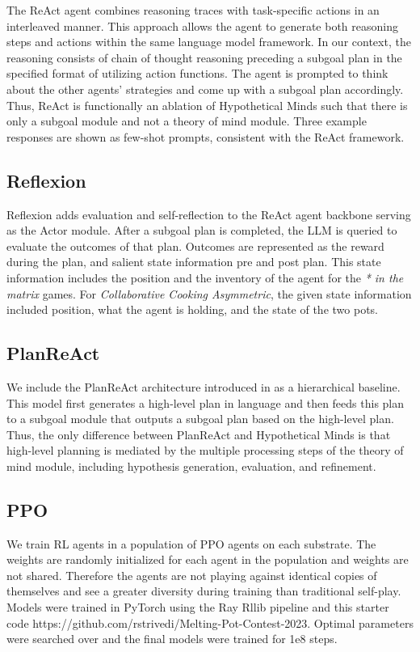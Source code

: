 \documentclass{article} %
\begin{document}
The ReAct \citep{yao2022react} agent combines reasoning traces with task-specific actions in an interleaved manner. This approach allows the agent to generate both reasoning steps and actions within the same language model framework. In our context, the reasoning consists of chain of thought reasoning preceding a subgoal plan in the specified format of utilizing action functions. The agent is prompted to think about the other agents' strategies and come up with a subgoal plan accordingly. Thus, ReAct is functionally an ablation of Hypothetical Minds such that there is only a subgoal module and not a theory of mind module. Three example responses are shown as few-shot prompts, consistent with the ReAct framework.

\subsection{Reflexion}

Reflexion adds evaluation and self-reflection to the ReAct agent backbone serving as the Actor module. After a subgoal plan is completed, the LLM is queried to evaluate the outcomes of that plan. Outcomes are represented as the reward during the plan, and salient state information pre and post plan. This state information includes the position and the inventory of the agent for the \textit{* in the matrix} games. For \textit{Collaborative Cooking Asymmetric}, the given state information included position, what the agent is holding, and the state of the two pots.

\subsection{PlanReAct}

We include the PlanReAct architecture introduced in \citep{liu2023bolaa} as a hierarchical baseline. This model first generates a high-level plan in language and then feeds this plan to a subgoal module that outputs a subgoal plan based on the high-level plan. Thus, the only
difference between PlanReAct and Hypothetical Minds is that high-level planning is mediated by the multiple processing steps of the theory of mind module, including hypothesis generation, evaluation, and refinement.

\subsection{PPO}

We train RL agents in a population of PPO agents \citep{schulman2017proximal} on each substrate. The weights are randomly initialized for each agent in the population and weights are not shared. Therefore the agents are not playing against identical copies of themselves and see a greater diversity during training than traditional self-play. Models were trained in PyTorch using the Ray Rllib pipeline and this starter code https://github.com/rstrivedi/Melting-Pot-Contest-2023. Optimal parameters were searched over and the final models were trained for 1e8 steps.
\end{document}

